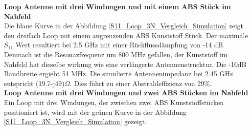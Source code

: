\textbf{Loop Antenne mit drei Windungen und mit einem ABS Stück im Nahfeld}\\
Die blaue Kurve in der Abbildung \ref{S11_Loop_3N_Vergleich_Simulation} zeigt den dreifach Loop mit einem angrenzenden ABS Kunststoff Stück. Der maximale $S_{11}$ Wert resultiert bei 2.5 GHz mit einer Rückflussdämpfung von -14 dB. Demnach ist die Resonazfrequenz um 800 MHz gefallen, der Kunststoff im Nahfeld hat dieselbe wirkung wie eine verlängerte Antennenstrucktur. Die -10dB Bandbreite ergiebt 51 MHz. Die simulierte Antennenimpedanz bei 2.45 GHz entspricht (19.7-j49)$\Omega$. Dies führt zu einer Abstrahleffizienz von 29$\%$.\\

\textbf{Loop Antenne mit drei Windungen und zwei ABS Stücken im Nahfeld}\\
Ein Loop mit drei Windungen, der zwischen zwei ABS Kunststoffstücken positioniert ist, wird mit der grünen Kurve in der Abbildung \ref{S11_Loop_3N_Vergleich_Simulation} gezeigt.\\

